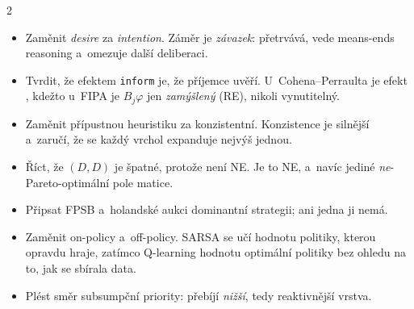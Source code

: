 \documentclass[10pt,a4paper]{article}
\newcommand{\ph}[1]{\par\smallskip\noindent{\bfseries\color{markcol}#1}\par\nobreak\vspace{-0.2em}}
\newcommand{\en}[1]{\emph{#1}}
\begin{document}
\begin{multicols}{2}
\ph{Nejčastější chyby}
\begin{itemize}
\item Zaměnit \en{desire} za \en{intention}. Záměr je \emph{závazek}: přetrvává, vede
  means-ends reasoning a~omezuje další deliberaci.
\item Tvrdit, že efektem \texttt{inform} je, že příjemce uvěří. U~Cohena--Perraulta je efekt
  , kdežto u~FIPA je $B_j\varphi$ jen \emph{zamýšlený} (RE),
  nikoli vynutitelný.
\item Zaměnit přípustnou heuristiku za konzistentní. Konzistence je silnější a~zaručí, že se
  každý vrchol expanduje nejvýš jednou.
\item Říct, že $(D,D)$ je špatné, protože není NE. Je to NE, a~navíc jediné
  \emph{ne}-Pareto-optimální pole matice.
\item Připsat FPSB a~holandské aukci dominantní strategii; ani jedna ji nemá.
\item Zaměnit on-policy a~off-policy. SARSA se učí hodnotu politiky, kterou opravdu hraje,
  zatímco Q-learning hodnotu optimální politiky bez ohledu na to, jak se sbírala data.
\item Plést směr subsumpční priority: přebíjí \emph{nižší}, tedy reaktivnější vrstva.
\end{itemize}

\end{multicols}

\newpage
\end{document}
